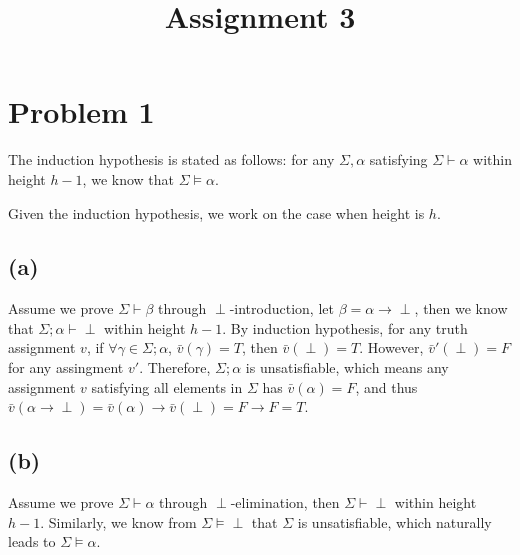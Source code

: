 \documentclass{article}
\title{\huge{\textbf{Assignment 3}}}
\author{\Chi{杨乐天}}
\date{}
\begin{document}
\maketitle

\section*{Problem 1}

	The induction hypothesis is stated as follows: for any $\Sigma, \alpha$ satisfying $\Sigma \vdash \alpha$ within height $h-1$, we know that $\Sigma \vDash \alpha$.
	
	Given the induction hypothesis, we work on the case when height is $h$.

\subsection*{(a)}

	Assume we prove $\Sigma \vdash \beta$ through $\perp$-introduction, let $\beta=\alpha\to\perp$, then we know that $\Sigma; \alpha \vdash \perp$ within height $h-1$. By induction hypothesis, for any truth assignment $v$, if $\forall \gamma \in \Sigma; \alpha$, $\bar{v} (\gamma)=T$, then $\bar{v} (\perp)=T$. However, $\bar{v}'(\perp)=F$ for any assingment $v'$. Therefore, $\Sigma; \alpha$ is unsatisfiable, which means any assignment $v$ satisfying all elements in $\Sigma$ has $\bar{v}(\alpha)=F$, and thus $\bar{v}(\alpha\to\perp)=\bar{v}(\alpha)\to\bar{v}(\perp)=F\to F=T$.
	
	
\subsection*{(b)}

	Assume we prove $\Sigma \vdash \alpha$ through $\perp$-elimination, then $\Sigma \vdash \perp$ within height $h-1$. Similarly, we know from $\Sigma \vDash \perp$ that $\Sigma$ is unsatisfiable, which naturally leads to $\Sigma \vDash \alpha$.
	
\end{document}
